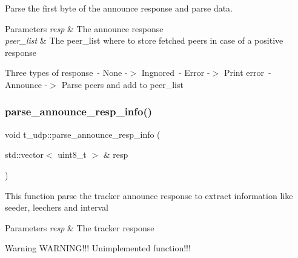 Parse the first byte of the announce response and parse data.


\begin{DoxyParams}{Parameters}
{\em resp} & The announce response \\
\hline
{\em peer\+\_\+list} & The peer\+\_\+list where to store fetched peers in case of a positive response\\
\hline
\end{DoxyParams}
Three types of response~-\/ None -\/$>$ Ingnored~-\/ Error -\/$>$ Print error~-\/ Announce -\/$>$ Parse peers and add to peer\+\_\+list~\newline
\mbox{\label{namespacet__udp_a42ced8af1acd3fb2bc46358effe48dbc}} 
\subsubsection{\texorpdfstring{parse\+\_\+announce\+\_\+resp\+\_\+info()}{parse\_announce\_resp\_info()}}
{\footnotesize\ttfamily void t\+\_\+udp\+::parse\+\_\+announce\+\_\+resp\+\_\+info (\begin{DoxyParamCaption}\item[{std\+::vector$<$ uint8\+\_\+t $>$ \&}]{resp }\end{DoxyParamCaption})}

This function parse the tracker announce response to extract information like seeder, leechers and interval


\begin{DoxyParams}{Parameters}
{\em resp} & The tracker response\\
\hline
\end{DoxyParams}
\begin{DoxyWarning}{Warning}
W\+A\+R\+N\+I\+N\+G!!! Unimplemented function!!! 
\end{DoxyWarning}
\mbox{\label{namespacet__udp_a8aa6906fdd81689928634df34688fed1}} 
